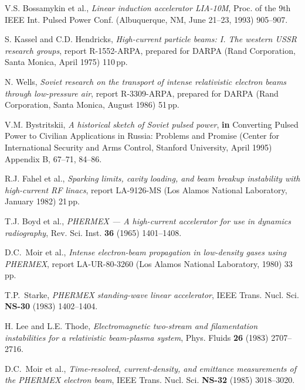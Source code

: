 \documentclass [12pt,a4paper,     ]{report} %
\begin{document}
\begin{enumerate}
 V.S. Bossamykin et al., \emph{Linear induction accelerator LIA-10M}, Proc. of the 9th IEEE Int. Pulsed Power Conf. (Albuquerque, NM, June 21--23, 1993) 905--907.

 S. Kassel and C.D. Hendricks, \emph{High-current particle beams: I. The western USSR research groups}, report R-1552-ARPA, prepared for DARPA (Rand Corporation, Santa Monica, April 1975) 110\,pp.

 N. Wells, \emph{Soviet research on the transport of intense relativistic electron beams through low-pressure air}, report R-3309-ARPA, prepared for DARPA (Rand Corporation, Santa Monica, August 1986) 51\,pp.

 V.M. Bystritskii, \emph{A historical sketch of Soviet pulsed power}, {\bf in} Converting Pulsed Power to Civilian Applications in Russia: Problems and Promise (Center for International Security and Arms Control, Stanford University, April 1995) Appendix B, 67--71, 84--86.

 R.J. Fahel et al., \emph{Sparking limits, cavity loading, and beam breakup instability with high-current RF linacs}, report LA-9126-MS (Los Alamos National Laboratory, January 1982) 21\,pp.

 T.J. Boyd et al., \emph{PHERMEX --- A high-current accelerator for use in dynamics radiography}, Rev. Sci. Inst. {\bf 36}  (1965) 1401--1408.


 D.C.\ Moir et al., \emph{Intense electron-beam propagation in low-density gases using PHERMEX}, report LA-UR-80-3260 (Los Alamos National Laboratory, 1980) 33\,pp.

 T.P.\ Starke, \emph{PHERMEX standing-wave linear accelerator}, IEEE Trans. Nucl. Sci. {\bf NS-30} (1983) 1402--1404.

 H. Lee and L.E. Thode, \emph{Electromagnetic two-stream and filamentation instabilities for a relativistic beam-plasma system}, Phys. Fluids {\bf 26} (1983) 2707--2716.

 D.C.\ Moir et al., \emph{Time-resolved, current-density, and emittance measurements of the PHERMEX electron beam}, IEEE Trans. Nucl. Sci. {\bf NS-32} (1985) 3018--3020.


\end{enumerate}
\end{document}
